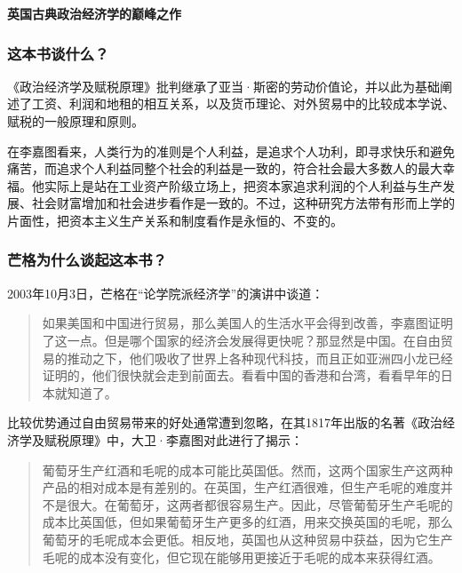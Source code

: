 \cleardoublepage
{}


\begin{BookSummaryBox}
\textbf{英国古典政治经济学的巅峰之作}
\par
\end{BookSummaryBox}

\subsubsection*{这本书谈什么？}

《政治经济学及赋税原理》批判继承了亚当·斯密的劳动价值论，并以此为基础阐述了工资、利润和地租的相互关系，以及货币理论、对外贸易中的比较成本学说、赋税的一般原理和原则。
\par

在李嘉图看来，人类行为的准则是个人利益，是追求个人功利，即寻求快乐和避免痛苦，而追求个人利益同整个社会的利益是一致的，符合社会最大多数人的最大幸福。他实际上是站在工业资产阶级立场上，把资本家追求利润的个人利益与生产发展、社会财富增加和社会进步看作是一致的。不过，这种研究方法带有形而上学的片面性，把资本主义生产关系和制度看作是永恒的、不变的。
\par

\subsubsection*{芒格为什么谈起这本书？}

2003年10月3日，芒格在“论学院派经济学”的演讲中谈道：
\par

\begin{quotation}
如果美国和中国进行贸易，那么美国人的生活水平会得到改善，李嘉图证明了这一点。但是哪个国家的经济会发展得更快呢？那显然是中国。在自由贸易的推动之下，他们吸收了世界上各种现代科技，而且正如亚洲四小龙已经证明的，他们很快就会走到前面去。看看中国的香港和台湾，看看早年的日本就知道了。
\par
\end{quotation}

比较优势通过自由贸易带来的好处通常遭到忽略，在其1817年出版的名著《政治经济学及赋税原理》中，大卫·李嘉图对此进行了揭示：
\par

\begin{quotation}
葡萄牙生产红酒和毛呢的成本可能比英国低。然而，这两个国家生产这两种产品的相对成本是有差别的。在英国，生产红酒很难，但生产毛呢的难度并不是很大。在葡萄牙，这两者都很容易生产。因此，尽管葡萄牙生产毛呢的成本比英国低，但如果葡萄牙生产更多的红酒，用来交换英国的毛呢，那么葡萄牙的毛呢成本会更低。相反地，英国也从这种贸易中获益，因为它生产毛呢的成本没有变化，但它现在能够用更接近于毛呢的成本来获得红酒。
\par
\end{quotation}

